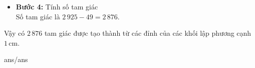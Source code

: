 \begin{ex}
{\begin{itemize}
\begin{enumerate}[\it TH 1:]
				\item Các đường thẳng song song với các cạnh của khối lập phương.
				\begin{itemize}
					\item Có $3$ hướng $\left(AB,AD,AA'\right)$.
					\item Mỗi hướng có $3\cdot 3=9$ đường thẳng (mỗi đường này gồm ba điểm thẳng hàng).
				\end{itemize}
				Số bộ ba điểm thẳng hàng là $3\cdot 9=27$ (bộ).
				\item Các đường thẳng song song với đường chéo của các mặt.
				\begin{itemize}
					\item Khối lập phương có $3$ hướng mặt phẳng $\left((ABCD),\left(ABB'A'\right),\left(ADD'A'\right)\right)$.
					\item Mỗi hướng có $3$ lớp mặt phẳng song song.
					\item Trên mỗi mặt phẳng có $2$ đường chéo chính chứa $3$ điểm.
				\end{itemize}
				Số bộ ba điểm thẳng hàng là $3\cdot 3\cdot 2=18$ (bộ).
				\item Các đường chéo đi qua tâm của khối lập phương lớn $\left(AC',BD',CA',DB'\right)$.\\
				Mỗi đường này chứa đúng $3$ điểm.\\
				Số bộ ba điểm thẳng hàng là $4$ (bộ).
			\end{enumerate}
			Tổng số bộ $3$ điểm thẳng hàng là $27+18+4=49$ (bộ).
			\item \textbf{Bước 4:} Tính số tam giác\\
			Số tam giác là $2\,925-49=2\,876$.
		\end{itemize}
		Vậy có $2\,876$ tam giác được tạo thành từ các đỉnh của các khối lập phương cạnh $1$\,cm.
	}
\end{ex}

\begin{indapan}
	{ans/ans\currfilebase}
\end{indapan}